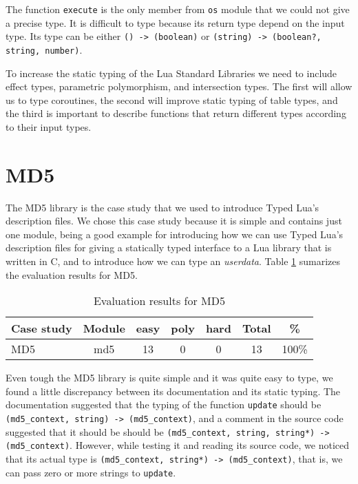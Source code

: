 The function \texttt{execute} is the only member from \texttt{os}
module that we could not give a precise type.
It is difficult to type because its return type depend on the
input type.
Its type can be either \texttt{() -> (boolean)} or
\texttt{(string) -> (boolean?, string, number)}.

To increase the static typing of the Lua Standard Libraries
we need to include effect types, parametric polymorphism,
and intersection types.
The first will allow us to type coroutines, the second will
improve static typing of table types, and the third is
important to describe functions that return different types
according to their input types.

\section{MD5}

The MD5 library \citep{lmd5} is the case study that we used to
introduce Typed Lua's description files.
We chose this case study because it is simple and contains just
one module, being a good example for introducing how we can use
Typed Lua's description files for giving a statically typed
interface to a Lua library that is written in C, and to 
introduce how we can type an \emph{userdata}.
Table \ref{tab:evalmd5} sumarizes the evaluation results for MD5.

\begin{table}[!ht]
\begin{center}
\begin{tabular}{|l|c|c|c|c|c|c|}
\hline
\textbf{Case study} & \textbf{Module} & \textbf{easy} & \textbf{poly} & \textbf{hard} & \textbf{Total} & \textbf{\%} \\
\hline
\multirow{1}{*}{MD5}
& md5 & 13 & 0 & 0 & 13 & 100\% \\
\hline
\end{tabular}
\end{center}
\caption{Evaluation results for MD5}
\label{tab:evalmd5}
\end{table}

Even tough the MD5 library is quite simple and it was quite easy to type,
we found a little discrepancy between its documentation and its static
typing.
The documentation suggested that the typing of the function \texttt{update}
should be \texttt{(md5\string_context, string) -> (md5\string_context)},
and a comment in the source code suggested that it should be
should be \texttt{(md5\string_context, string, string*) -> (md5\string_context)}.
However, while testing it and reading its source code, we noticed that
its actual type is \texttt{(md5\string_context, string*) -> (md5\string_context)},
that is, we can pass zero or more strings to \texttt{update}.

